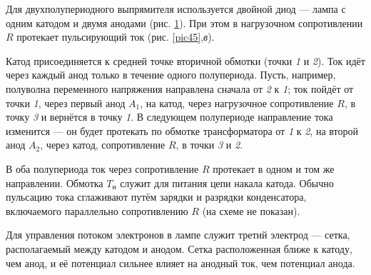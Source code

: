\documentclass[a4paper,10pt]{book}
\begin{document}
Для двухполупериодного выпрямителя используется двойной диод — лампа с одним катодом и двумя анодами (рис. \ref{pic46}). При этом в нагрузочном сопротивлении $R$ протекает пульсирующий ток (рис. \ref{pic45},\textit{в}). 

\begin{figure}[h]
	\caption{}
	\label{pic46}
\end{figure}

Катод присоединяется к средней точке вторичной обмотки (точки \textit{1} и \textit{2}). Ток идёт через каждый анод только в течение одного полупериода. Пусть, например, полуволна переменного напряжения направлена сначала от \textit{2} к \textit{1}; ток пойдёт от точки \textit{1}, через первый анод $A_1$, на катод, через нагрузочное сопротивление $R$, в точку \textit{3} и вернётся в точку \textit{1}. В следующем полупериоде направление тока изменится — он будет протекать по обмотке трансформатора от \textit{1} к \textit{2}, на второй анод $A_2$, через катод, сопротивление $R$, в точки \textit{3} и \textit{2}.

В оба полупериода ток через сопротивление $R$ протекает в одном и том же направлении. Обмотка $T_\text{н}$ служит для питания цепи накала катода. Обычно пульсацию тока сглаживают путём зарядки и разрядки конденсатора, включаемого параллельно сопротивлению $R$ (на схеме не показан).

Для управления потоком электронов в лампе служит третий электрод — сетка, располагаемый между катодом и анодом. Сетка расположенная ближе к катоду, чем анод, и её потенциал сильнее влияет на анодный ток, чем потенциал анода.
\end{document}
